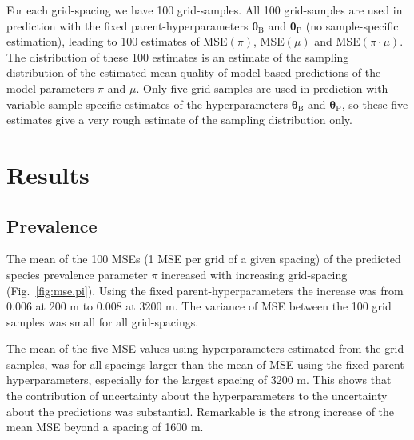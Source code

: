\documentclass[review]{elsarticle}
\begin{document}
For each grid-spacing we have 100 grid-samples. All 100 grid-samples are used in prediction with the fixed parent-hyperparameters $\boldsymbol{\theta}_{\mathrm{B}}$ and $\boldsymbol{\theta}_{\mathrm{P}}$ (no sample-specific estimation), leading to 100 estimates of MSE$(\pi)$, MSE$(\mu)$ and MSE$(\pi \cdot \mu)$. The distribution of these 100 estimates is an estimate of the sampling distribution of the estimated mean quality of model-based predictions of the model parameters $\pi$ and $\mu$. Only five grid-samples are used in prediction with variable sample-specific estimates of the hyperparameters $\boldsymbol{\theta}_{\mathrm{B}}$ and $\boldsymbol{\theta}_{\mathrm{P}}$, so these five estimates give a very rough estimate of the sampling distribution only.

\section{Results} \label{sec:results}

\subsection{Prevalence}
The mean of the 100 MSEs (1 MSE per grid of a given spacing) of the predicted species prevalence parameter $\pi$ increased with increasing grid-spacing (Fig.~\ref{fig:mse.pi}).
Using the fixed parent-hyperparameters the increase was from 0.006 at 200 m to 0.008 at 3200 m. The variance of MSE between the 100 grid samples was small for all grid-spacings.

The mean of the five MSE values using hyperparameters estimated from the grid-samples, was for all spacings larger than the mean of MSE using the fixed parent-hyperparameters, especially for the largest spacing of 3200 m. This shows that the contribution of uncertainty about the hyperparameters to the uncertainty about the predictions was substantial. Remarkable is the strong increase of the mean MSE beyond a spacing of 1600 m.
\end{document}
